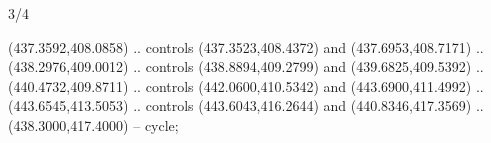 \begin{flagdescription}{3/4}
\begin{scope}[xshift=0.5\flaglength]
\begin{scope}[scale=0.002\flagwidth,yshift=146.5mm,xshift=-52mm]
\begin{scope}[y=0.80pt, x=0.80pt, yscale=-1, xscale=1, inner sep=0pt, outer sep=0pt]
\begin{scope}[cm={{1.03426,0.0,0.0,1.03426,(-229.44745,-87.97837)}}]
\begin{scope}[fill=black]
  (437.3592,408.0858) .. controls (437.3523,408.4372) and (437.6953,408.7171) ..
  (438.2976,409.0012) .. controls (438.8894,409.2799) and (439.6825,409.5392) ..
  (440.4732,409.8711) .. controls (442.0600,410.5342) and (443.6900,411.4992) ..
  (443.6545,413.5053) .. controls (443.6043,416.2644) and (440.8346,417.3569) ..
  (438.3000,417.4000) -- cycle;
\end{scope}
\end{scope}
\end{scope}
\end{scope}
\end{scope}
\fi
\framecode{}
\end{flagdescription}
